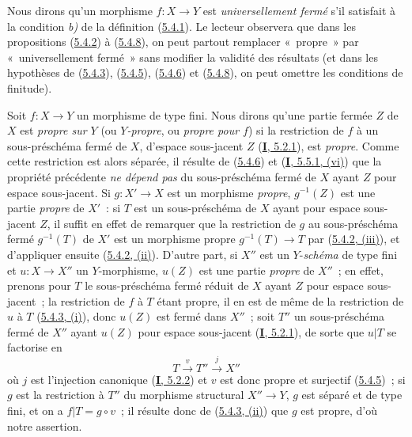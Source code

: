 \begin{remark}[5.4.9]
\label{II.5.4.9-fr}
Nous dirons qu'un morphisme $f:X\to Y$ est \emph{universellement fermé} s'il
satisfait à la condition \emph{b)} de la définition
(\hyperref[II.5.4.1-fr]{5.4.1}). Le lecteur observera que
dans les propositions (\hyperref[II.5.4.2-fr]{5.4.2}) à
(\hyperref[II.5.4.8-fr]{5.4.8}), on peut partout remplacer «~propre~» par
«~universellement fermé~» sans modifier la validité des résultats (et dans
les hypothèses de (\hyperref[II.5.4.3-fr]{5.4.3}),
(\hyperref[II.5.4.5-fr]{5.4.5}), (\hyperref[II.5.4.6-fr]{5.4.6}) et
(\hyperref[II.5.4.8-fr]{5.4.8}), on peut omettre les conditions de
finitude).
\end{remark}

\begin{env}[5.4.10]
\label{II.5.4.10-fr}
Soit $f:X\to Y$ un morphisme de type fini. Nous dirons qu'une partie fermée
$Z$ de $X$ est \emph{propre sur $Y$} (ou \emph{$Y$-propre}, ou \emph{propre
pour $f$}) si la restriction de $f$ à un sous-préschéma fermé de $X$,
d'espace sous-jacent $Z$ (\hyperref[I.5.2.1-fr]{\textbf{I}, 5.2.1}), est \emph{propre}.
Comme cette restriction est alors séparée, il résulte de
(\hyperref[II.5.4.6-fr]{5.4.6}) et (\hyperref[I.5.5.1-fr]{\textbf{I}, 5.5.1, (vi)})
que la propriété précédente \emph{ne dépend pas} du sous-préschéma fermé de $X$
ayant $Z$ pour espace sous-jacent. Si $g:X'\to X$ est un morphisme \emph{propre},
$g^{-1}(Z)$ est une partie \emph{propre} de $X'$~: si $T$ est un sous-préschéma de
$X$ ayant pour espace sous-jacent $Z$, il suffit en effet de remarquer que
la restriction de $g$ au sous-préschéma fermé $g^{-1}(T)$ de $X'$ est un
morphisme propre $g^{-1}(T)\to T$ par
(\hyperref[II.5.4.2-fr]{5.4.2, (iii)}), et d'appliquer ensuite
(\hyperref[II.5.4.2-fr]{5.4.2, (ii)}). D'autre part, si $X''$ est un
$Y$-\emph{schéma} de type fini et $u:X\to X''$ un $Y$-morphisme, $u(Z)$ est une
partie \emph{propre} de $X''$~; en effet, prenons pour $T$ le sous-préschéma fermé
réduit de $X$ ayant $Z$ pour espace sous-jacent~; la restriction de $f$ à
$T$ étant propre, il en est de même de la restriction de $u$ à $T$
(\hyperref[II.5.4.3-fr]{5.4.3, (i)}), donc $u(Z)$ est fermé dans $X''$~;
soit $T''$ un sous-préschéma fermé de $X''$ ayant $u(Z)$ pour espace
sous-jacent (\hyperref[I.5.2.1-fr]{\textbf{I}, 5.2.1}), de sorte que $u|T$ se
factorise en
\[
  T\xrightarrow{v}T''\xrightarrow{j}X''
\]
où $j$ est l'injection canonique (\hyperref[I.5.2.2-fr]{\textbf{I}, 5.2.2}) et $v$
est donc propre et surjectif (\hyperref[II.5.4.5-fr]{5.4.5})~; si $g$ est la
restriction à $T''$ du morphisme structural $X''\to Y$, $g$ est séparé et
de type fini, et on a $f|T=g\circ v$~; il résulte donc de
(\hyperref[II.5.4.3-fr]{5.4.3, (ii)}) que $g$ est propre, d'où notre
assertion.
\end{env}

